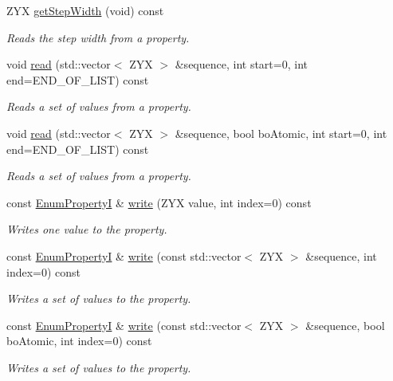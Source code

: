 \begin{DoxyCompactItemize}
Z\+Y\+X \hyperlink{classmv_i_m_p_a_c_t_1_1acquire_1_1_enum_property_i_adbde309dafa838994988a9bb3c674471}{get\+Step\+Width} (void) const 
\begin{DoxyCompactList}\small\item\em Reads the step width from a property. \end{DoxyCompactList}\item 
void \hyperlink{classmv_i_m_p_a_c_t_1_1acquire_1_1_enum_property_i_a3dc6f850fbcb0f81b9d6d8b2dbe59f8b}{read} (std\+::vector$<$ Z\+Y\+X $>$ \&sequence, int start=0, int end=E\+N\+D\+\_\+\+O\+F\+\_\+\+L\+I\+S\+T) const 
\begin{DoxyCompactList}\small\item\em Reads a set of values from a property. \end{DoxyCompactList}\item 
void \hyperlink{classmv_i_m_p_a_c_t_1_1acquire_1_1_enum_property_i_a0f41652b27f6bb72ab1e2c8be2daf2ca}{read} (std\+::vector$<$ Z\+Y\+X $>$ \&sequence, bool bo\+Atomic, int start=0, int end=E\+N\+D\+\_\+\+O\+F\+\_\+\+L\+I\+S\+T) const 
\begin{DoxyCompactList}\small\item\em Reads a set of values from a property. \end{DoxyCompactList}\item 
const \hyperlink{classmv_i_m_p_a_c_t_1_1acquire_1_1_enum_property_i}{Enum\+Property\+I} \& \hyperlink{classmv_i_m_p_a_c_t_1_1acquire_1_1_enum_property_i_a5f8110041cdd79bc953d9933737f5812}{write} (Z\+Y\+X value, int index=0) const 
\begin{DoxyCompactList}\small\item\em Writes one value to the property. \end{DoxyCompactList}\item 
const \hyperlink{classmv_i_m_p_a_c_t_1_1acquire_1_1_enum_property_i}{Enum\+Property\+I} \& \hyperlink{classmv_i_m_p_a_c_t_1_1acquire_1_1_enum_property_i_a4396e1d2923d38c40fecc991fe291899}{write} (const std\+::vector$<$ Z\+Y\+X $>$ \&sequence, int index=0) const 
\begin{DoxyCompactList}\small\item\em Writes a set of values to the property. \end{DoxyCompactList}\item 
const \hyperlink{classmv_i_m_p_a_c_t_1_1acquire_1_1_enum_property_i}{Enum\+Property\+I} \& \hyperlink{classmv_i_m_p_a_c_t_1_1acquire_1_1_enum_property_i_a8603d6f40010cb18abd6e6570d30d138}{write} (const std\+::vector$<$ Z\+Y\+X $>$ \&sequence, bool bo\+Atomic, int index=0) const 
\begin{DoxyCompactList}\small\item\em Writes a set of values to the property. \end{DoxyCompactList}\end{DoxyCompactItemize}
